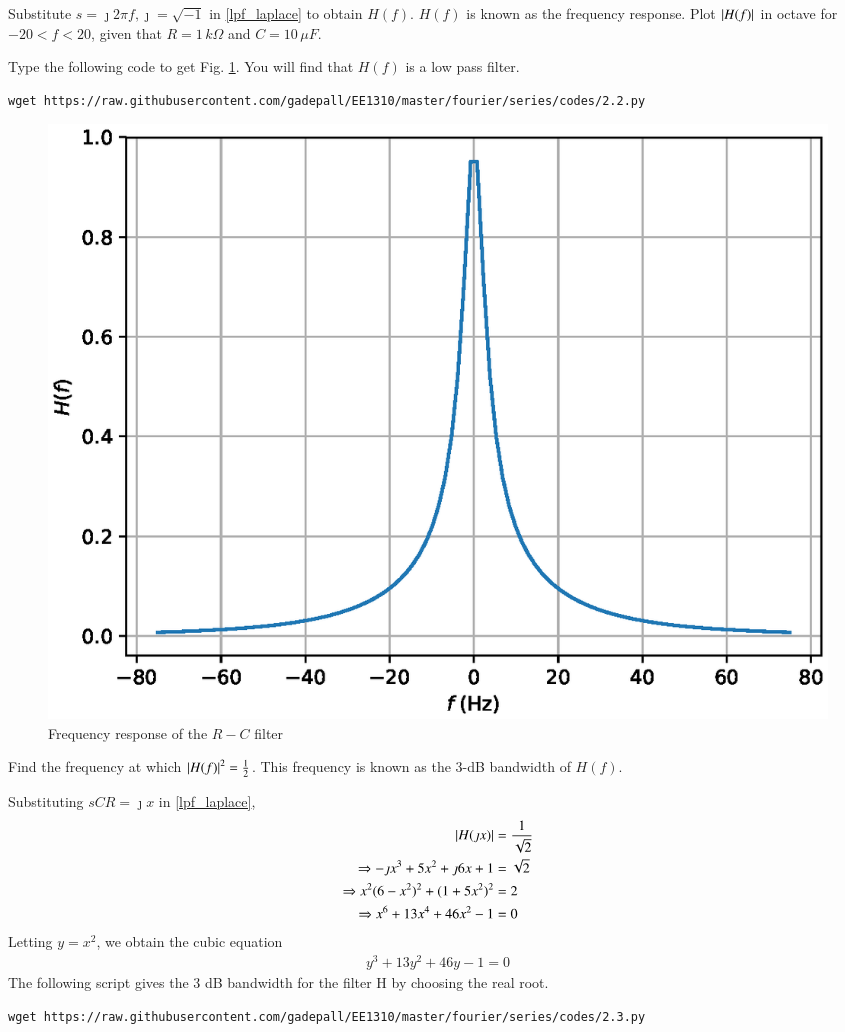 \documentclass[journal,12pt,twocolumn]{IEEEtran}
\begin{document}
%
\begin{problem}
Substitute $s = \jmath 2\pi f, \jmath =  \sqrt{-1}$ in \eqref{lpf_laplace} to obtain $H(f)$.  
$H(f)$ is 
known as the frequency response. Plot $\left\vert H(f)\right\vert$ in octave for $-20 < f < 20$, given that $R = 1 \,k\Omega$ and $C = 10 \,\mu F$.
\end{problem}
%
\solution 
%
Type  the following code to get Fig. \ref{fig:filter_plot}.  You will find that $H(f)$ is a low pass
filter.
%
\begin{lstlisting}
wget https://raw.githubusercontent.com/gadepall/EE1310/master/fourier/series/codes/2.2.py
\end{lstlisting}

%
%
\begin{figure}[!h]
\centering
\includegraphics[width=\columnwidth]{./figs/2.2.eps}
\caption{Frequency response of the $R-C$ filter}
\label{fig:filter_plot}
\end{figure}
\begin{problem}
Find the frequency at which $\left\vert H(f)\right\vert^2 = \frac{1}{2}$. This frequency is
known as the 3-dB bandwidth of $H(f)$.
\end{problem}
%
\solution Substituting $sCR = \jmath x$ in \eqref{lpf_laplace},
%
\begin{align}
 \left\vert H(\jmath x)\right\vert &= \frac{1}{\sqrt{2}} \\
 \Rightarrow 
 -\jmath x^3 + 5x^2 +\jmath 6x + 1 &= \sqrt{2} \\
\Rightarrow 
 x^2(6-x^2)^2 + (1+5x^2)^2 &= 2 \\
 \Rightarrow 
x^6 + 13x^4 + 46x^2 -1&= 0 
\end{align}
%
Letting $y=x^2$, we obtain the cubic equation
%
\begin{align}
y^3 + 13y^2 + 46 y -1 = 0
\end{align}
%
The following script gives the 3 dB bandwidth for the filter H by choosing the 
real root.
%
\begin{lstlisting}
wget https://raw.githubusercontent.com/gadepall/EE1310/master/fourier/series/codes/2.3.py
\end{lstlisting}
\end{document}
